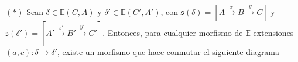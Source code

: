 \documentclass[preview]{standalone}
\begin{document}
\begin{center}
\justifying $(\ast)$ Sean $\delta\in\mathbb{E}(C,A)$ y $\delta'\in\mathbb{E}(C',A')$, con $\mathfrak{s}(\delta) = [A\xrightarrow{x} B\xrightarrow{y} C]$ y $\mathfrak{s}(\delta') = [A'\xrightarrow{x'} B'\xrightarrow{y'} C']$. Entonces, para cualquier morfismo de $\mathbb{E}$-extensiones $(a,c):\delta\to\delta'$, existe un morfismo  que hace conmutar el siguiente diagrama
\end{center}
\end{document}

